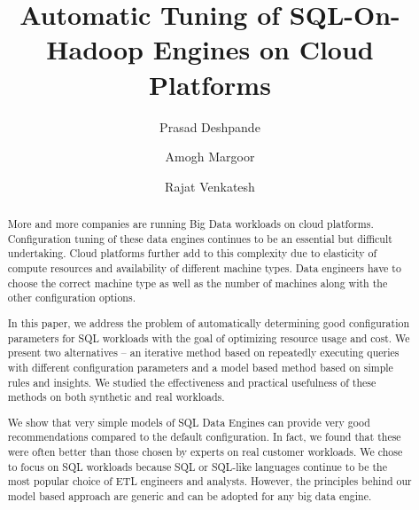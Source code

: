 \documentclass[sigconf]{acmart}
\newcommand{\eat}[1]{}
\begin{document}
\title{Automatic Tuning of SQL-On-Hadoop Engines on Cloud Platforms}

\author{Prasad Deshpande}

\author{Amogh Margoor}

\author{Rajat Venkatesh}

\renewcommand{\shortauthors}{P. Deshpande et al.}


\begin{abstract}
More and more companies are running Big Data workloads on cloud platforms. Configuration tuning of these data engines continues to be an essential but difficult undertaking. Cloud platforms further add to this complexity due to elasticity of compute resources and availability of different machine types. Data engineers have to choose the correct machine type as well as the number of machines along with the other configuration options.

In this paper, we address the problem of automatically determining good configuration parameters for SQL workloads with the goal of optimizing resource usage and cost. We present two alternatives -- an iterative method based on repeatedly executing queries with different configuration parameters and a model based method based on simple rules and insights. We studied the effectiveness and practical usefulness of these methods on both synthetic and real workloads.

We show that very simple models of SQL Data Engines can provide very good recommendations compared to the default configuration. In fact, we found that these were often better than those chosen by experts on real customer workloads. We chose to focus on SQL workloads because SQL or SQL-like languages continue to be the most popular choice of ETL engineers and analysts.  However, the principles behind our model based approach are generic and can be adopted for any big data engine. 
\end{abstract}
\eat{
\begin{CCSXML}
<ccs2012>
<concept>
<concept_id>10002951.10002952.10003190.10003195.10010837</concept_id>
<concept_desc>Information systems~MapReduce-based systems</concept_desc>
<concept_significance>500</concept_significance>
</concept>
<concept>
<concept_id>10002951.10002952.10003190.10003195.10010838</concept_id>
<concept_desc>Information systems~Relational parallel and distributed DBMSs</concept_desc>
<concept_significance>500</concept_significance>
</concept>
<concept>
<concept_id>10002951.10002952.10003212.10003216</concept_id>
<concept_desc>Information systems~Autonomous database administration</concept_desc>
<concept_significance>500</concept_significance>
</concept>
</ccs2012>
\end{CCSXML}
}
\end{document}
